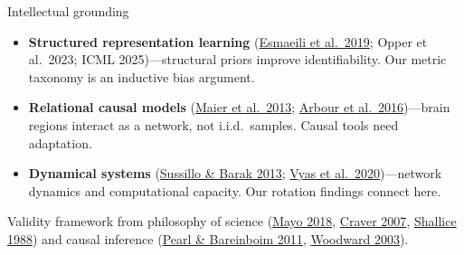 \documentclass[aspectratio=169,11pt]{beamer}
\begin{document}
\begin{frame}{Intellectual grounding}
\begin{itemize}\setlength\itemsep{3pt}
  \item {\small \textbf{Structured representation learning} (\href{https://proceedings.mlr.press/v89/esmaeili19a}{Esmaeili et al.\ 2019}; Opper et al.\ 2023; ICML 2025)---structural priors improve identifiability. Our metric taxonomy is an inductive bias argument.}
  \item {\small \textbf{Relational causal models} (\href{https://arxiv.org/abs/1309.6843}{Maier et al.\ 2013}; \href{https://www.auai.org/uai2016/proceedings/papers/217.pdf}{Arbour et al.\ 2016})---brain regions interact as a network, not i.i.d.\ samples. Causal tools need adaptation.}
  \item {\small \textbf{Dynamical systems} (\href{https://doi.org/10.1162/NECO_a_00409}{Sussillo \& Barak 2013}; \href{https://doi.org/10.1146/annurev-neuro-092619-094115}{Vyas et al.\ 2020})---network dynamics and computational capacity. Our rotation findings connect here.}
\end{itemize}

\vspace{0.3em}
{\small Validity framework from philosophy of science (\href{https://doi.org/10.1017/9781107286184}{Mayo 2018}, \href{https://doi.org/10.1093/acprof:oso/9780199299317.001.0001}{Craver 2007}, \href{https://doi.org/10.1017/CBO9780511526817}{Shallice 1988}) and causal inference (\href{https://arxiv.org/abs/1203.3519}{Pearl \& Bareinboim 2011}, \href{https://doi.org/10.1093/0195155270.001.0001}{Woodward 2003}).}
\end{frame}


\begin{frame}[plain]
\vfill
\begin{center}
  \setlength{\fboxrule}{2.5pt}%
\end{center}
\vfill
\end{frame}
\end{document}
